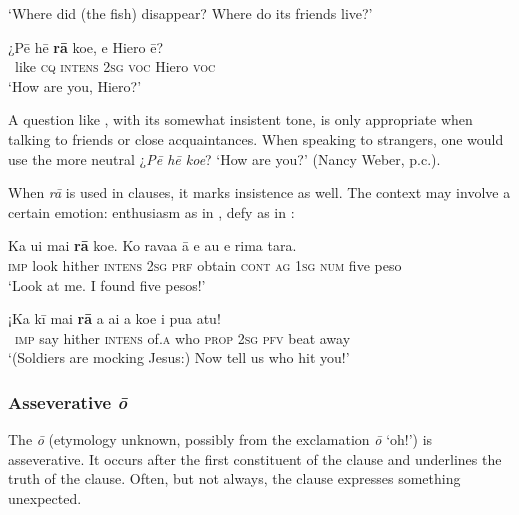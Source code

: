 \glt 
‘Where did (the fish) disappear? Where do its friends live?’ \textstyleExampleref{[R301.179,182]}
\z

\ea\label{ex:4.181}
\gll ¿Pē hē \textbf{rā} koe, e Hiero ē? \\
~like \textsc{cq} \textsc{intens} \textsc{2sg} \textsc{voc} Hiero \textsc{voc} \\

\glt
‘How are you, Hiero?’ \textstyleExampleref{[R315.081]} 
\z

A question like , with its somewhat insistent tone, is only appropriate when talking to friends or close acquaintances. When speaking to strangers, one would use the more neutral ¿\textit{Pē hē koe}? ‘How are you?’ (Nancy Weber, p.c.).

When \textit{rā} is used in  clauses, it marks insistence as well. The context may involve a certain emotion: enthusiasm as in , defy as in :

\ea\label{ex:4.182}
\gll Ka u{\ꞌ}i mai \textbf{rā} koe. Ko rava{\ꞌ}a {\ꞌ}ā e au e rima tara. \\
\textsc{imp} look hither \textsc{intens} \textsc{2sg} \textsc{prf} obtain \textsc{cont} \textsc{ag} \textsc{1sg} \textsc{num} five peso \\

\glt 
‘Look at me. I found five pesos!’ \textstyleExampleref{[R334.288–289]}
\z

\ea\label{ex:4.183}
\gll ¡Ka kī mai \textbf{rā} {\ꞌ}a {\ꞌ}ai a koe i pu{\ꞌ}a atu!\\
~\textsc{imp} say hither \textsc{intens} of\textsc{.a} who \textsc{prop} \textsc{2sg} \textsc{pfv} beat away\\

\glt 
‘(Soldiers are mocking Jesus:) Now tell us who hit you!’ \textstyleExampleref{[Mark 14:65]}
\z
{}
\subsubsection[Asseverative {\ꞌ}ō]{Asseverative \textit{{\ꞌ}ō}}\label{sec:4.5.4.5}
The  \textit{{\ꞌ}ō} (etymology unknown, possibly from the exclamation \textit{{\ꞌ}ō} ‘oh!’) is asseverative. It occurs after the first constituent of the clause and underlines the truth of the clause. Often, but not always, the clause expresses something unexpected.

